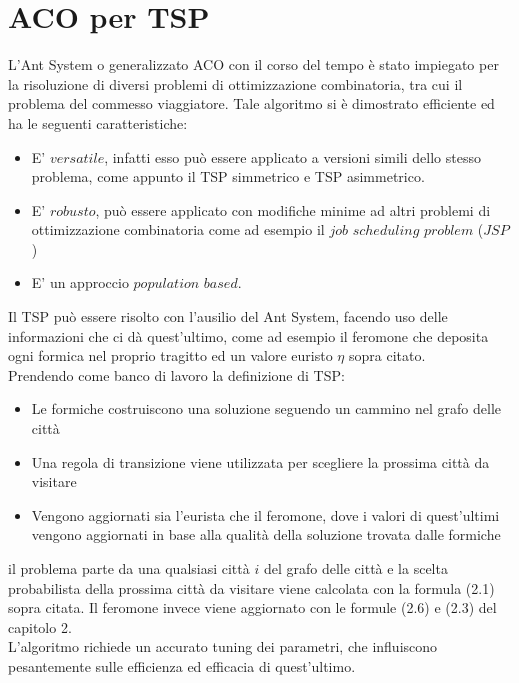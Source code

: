 \documentclass[a4paper,12pt]{report}
\begin{document}
\section{ACO per TSP}
L'Ant System o generalizzato ACO con il corso del tempo è stato impiegato per la risoluzione di diversi problemi di ottimizzazione combinatoria, tra cui il problema del commesso viaggiatore.
Tale algoritmo si è dimostrato efficiente  ed ha le seguenti caratteristiche:
\begin{itemize}
    \item E' $versatile$, infatti esso può essere applicato a versioni simili dello stesso problema, come appunto il TSP simmetrico e TSP asimmetrico.
\end{itemize}
\begin{itemize}
    \item E' $robusto$, può essere applicato con modifiche minime ad altri problemi di ottimizzazione combinatoria come ad esempio il $job$ $scheduling$ $problem$ ($JSP$)
\end{itemize}
\begin{itemize}
    \item E' un approccio $population$ $based$.
\end{itemize}
Il TSP può essere risolto con l'ausilio del Ant System, facendo uso delle informazioni che ci dà quest'ultimo, come ad esempio il feromone che deposita ogni formica nel proprio tragitto ed un valore euristo $\eta$ sopra citato.\\
Prendendo come banco di lavoro la definizione di TSP:
    \begin{itemize}
        \item Le formiche costruiscono una soluzione seguendo un cammino nel grafo delle città
    \end{itemize}
    \begin{itemize}
        \item Una regola di transizione viene utilizzata per scegliere la prossima città da visitare
    \end{itemize}
    \begin{itemize}
        \item Vengono aggiornati sia l'eurista che il feromone, dove i valori di quest'ultimi vengono aggiornati in base alla qualità della soluzione trovata dalle formiche 
    \end{itemize}
il problema parte da una qualsiasi città $i$ del grafo delle città e la scelta probabilista della prossima città da visitare viene calcolata con la formula (2.1) sopra citata. Il feromone invece viene aggiornato con le formule (2.6) e (2.3) del capitolo 2.\\
L'algoritmo richiede un accurato tuning dei parametri, che influiscono pesantemente sulle efficienza ed efficacia di quest'ultimo.
\end{document}
